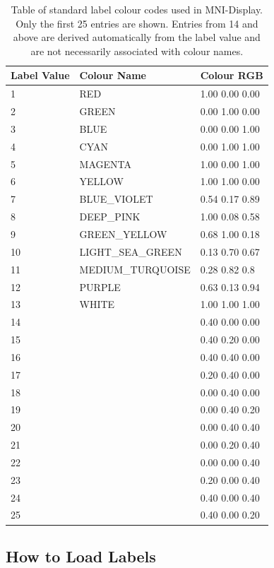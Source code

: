 \documentclass[11pt,letterpaper]{article}
\newcommand{\display}{\mbox{MNI-Display}}
\begin{document}
\begin{table}
\centering
\caption{Table of standard label colour codes used in \display{}. Only
 the first 25 entries are shown. Entries from 14 and above are
 derived automatically from the label value and are not necessarily associated
with colour names.}
\begin{small}
\begin{tabular}{l|l|l}
Label Value & Colour Name & Colour RGB \\
\hline
1 & RED & 1.00 0.00 0.00 \\
2 & GREEN & 0.00 1.00 0.00 \\
3 & BLUE & 0.00 0.00 1.00 \\
4 & CYAN & 0.00 1.00 1.00\\
5 & MAGENTA & 1.00 0.00 1.00 \\
6 & YELLOW & 1.00 1.00 0.00 \\
7 & BLUE\_VIOLET & 0.54 0.17 0.89 \\
8 & DEEP\_PINK & 1.00 0.08 0.58 \\
9 & GREEN\_YELLOW & 0.68 1.00 0.18 \\
10 & LIGHT\_SEA\_GREEN & 0.13 0.70 0.67 \\
11 & MEDIUM\_TURQUOISE & 0.28 0.82 0.8 \\
12 & PURPLE & 0.63 0.13 0.94 \\
13 & WHITE & 1.00 1.00 1.00 \\
14 & & 0.40 0.00 0.00 \\
15 & & 0.40 0.20 0.00 \\
16 & & 0.40 0.40 0.00 \\
17 & & 0.20 0.40 0.00 \\
18 & & 0.00 0.40 0.00 \\
19 & & 0.00 0.40 0.20 \\
20 & & 0.00 0.40 0.40 \\
21 & & 0.00 0.20 0.40 \\
22 & & 0.00 0.00 0.40 \\
23 & & 0.20 0.00 0.40 \\
24 & & 0.40 0.00 0.40 \\
25 & & 0.40 0.00 0.20 \\
\hline
\end{tabular}
\end{small}
\label{tabLabCol}
\end{table}

\subsection{How to Load Labels}
\end{document}
